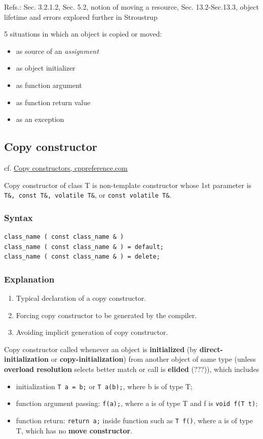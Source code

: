 \documentclass[10pt]{amsart}
\begin{document}
\begin{multicols*}{2}
Refs.: Sec. 3.2.1.2, Sec. 5.2, notion of moving a resource, Sec. 13.2-Sec.13.3, object lifetime and errors explored further in Stroustrup \cite{Stro2013}  
  
  
5 situations in which an object is copied or moved:   
\begin{itemize}
	\item as source of an \emph{assignment}
	\item as object initializer 
	\item as function argument
	\item as function return value
	\item as an exception  
\end{itemize}


\subsection{Copy constructor}

cf. \href{http://en.cppreference.com/w/cpp/language/copy_constructor}{Copy constructors, cppreference.com}

Copy constructor of class T is non-template constructor whose 1st parameter is \verb|T&, const T&, volatile T&|, or \verb|const volatile T&|.  

\subsubsection{Syntax}  

\begin{lstlisting}
class_name ( const class_name & )  
class_name ( const class_name & ) = default;  
class_name ( const class_name & ) = delete;
\end{lstlisting}  

\subsubsection{Explanation}  
\begin{enumerate}
\item Typical declaration of a copy constructor.  
\item Forcing copy constructor to be generated by the compiler.  
\item Avoiding implicit generation of copy constructor.  
\end{enumerate}


Copy constructor called whenever an object is \textbf{initialized} (by \textbf{direct-initialization} or \textbf{copy-initialization}) from another object of same type (unless \textbf{overload resolution} selects better match or call is \textbf{elided} (???)), which includes  
\begin{itemize}
\item initialization \verb|T a = b;| or \verb|T a(b);|, where b is of type T;  
\item function argument passing: \verb|f(a);|, where a is of type T and f is \verb|void f(T t)|;  
\item function return: \verb|return a;| inside function such as \verb|T f()|, where a is of type T, which has no \textbf{move constructor}.   
\end{itemize}


\end{multicols*}
\end{document}
